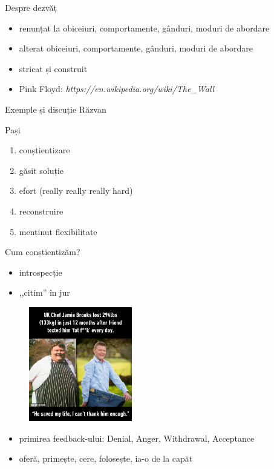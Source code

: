 \documentclass{beamer}
\begin{document}
\begin{frame}{Despre dezvăț}
  \begin{itemize}
    \pause \item renunțat la obiceiuri, comportamente, gânduri, moduri de abordare
    \pause \item alterat obiceiuri, comportamente, gânduri, moduri de abordare
    \pause \item stricat și construit
    \pause \item Pink Floyd: \textit{https://en.wikipedia.org/wiki/The\_Wall}
  \end{itemize}
\end{frame}

\begin{frame}{Exemple și discuție}
  Răzvan
\end{frame}

\begin{frame}{Pași}
  \begin{enumerate}
    \pause \item conștientizare
    \pause \item găsit soluție
    \pause \item efort (really really really hard)
    \pause \item reconstruire
    \pause \item menținut flexibilitate
  \end{enumerate}
\end{frame}

\begin{frame}{Cum conștientizăm?}
  \begin{itemize}
    \pause \item introspecție
    \pause \item ,,citim'' în jur
  \end{itemize}
  \pause
  \begin{figure}
    \centering
    \includegraphics[width=0.4\textwidth]{img/getting-nasty-feedback.jpg}
  \end{figure}
  \begin{itemize}
    \pause \item primirea feedback-ului: Denial, Anger, Withdrawal, Acceptance
    \pause \item oferă, primește, cere, folosește, ia-o de la capăt
  \end{itemize}
\end{frame}
\end{document}
